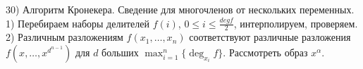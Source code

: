 30) Алгоритм Кронекера. Сведение для многочленов от нескольких переменных.\\

 1) Перебираем наборы делителей $f(i)$, $0 \le i \le \frac{deg f}{2}$, интерполируем, проверяем. 2) Различным разложениям $f(x_1,\dots,x_n)$ соответствуют различные разложения $f(x, \dots, x^{d^{n-1}})$ для $d$ больших $\max_{i=1}^n \{\deg_{x_i} f\}$. Рассмотреть образ $x^\alpha$.\\
